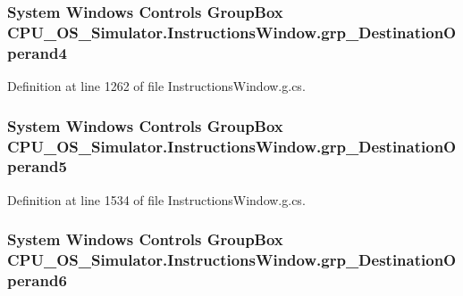 \subsubsection[{grp\+\_\+\+Destination\+Operand4}]{\setlength{\rightskip}{0pt plus 5cm}System Windows Controls Group\+Box C\+P\+U\+\_\+\+O\+S\+\_\+\+Simulator.\+Instructions\+Window.\+grp\+\_\+\+Destination\+Operand4\hspace{0.3cm}{\ttfamily [package]}}\label{class_c_p_u___o_s___simulator_1_1_instructions_window_a68c2f892a54f7826baacf9c828431fa8}


Definition at line 1262 of file Instructions\+Window.\+g.\+cs.

\hypertarget{class_c_p_u___o_s___simulator_1_1_instructions_window_aa99ecad0d35bc5e70a8924c9b3913106}{}
\subsubsection[{grp\+\_\+\+Destination\+Operand5}]{\setlength{\rightskip}{0pt plus 5cm}System Windows Controls Group\+Box C\+P\+U\+\_\+\+O\+S\+\_\+\+Simulator.\+Instructions\+Window.\+grp\+\_\+\+Destination\+Operand5\hspace{0.3cm}{\ttfamily [package]}}\label{class_c_p_u___o_s___simulator_1_1_instructions_window_aa99ecad0d35bc5e70a8924c9b3913106}


Definition at line 1534 of file Instructions\+Window.\+g.\+cs.

\hypertarget{class_c_p_u___o_s___simulator_1_1_instructions_window_a8e457b3503625b5e837320ad9eb439c6}{}
\subsubsection[{grp\+\_\+\+Destination\+Operand6}]{\setlength{\rightskip}{0pt plus 5cm}System Windows Controls Group\+Box C\+P\+U\+\_\+\+O\+S\+\_\+\+Simulator.\+Instructions\+Window.\+grp\+\_\+\+Destination\+Operand6\hspace{0.3cm}{\ttfamily [package]}}\label{class_c_p_u___o_s___simulator_1_1_instructions_window_a8e457b3503625b5e837320ad9eb439c6}



